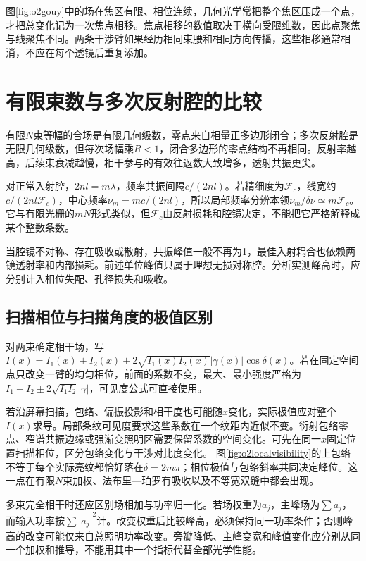 图\ref{fig:o2gouy}中的场在焦区有限、相位连续，几何光学常把整个焦区压成一个点，才把总变化记为一次焦点相移。焦点相移的数值取决于横向受限维数，因此点聚焦与线聚焦不同。两条干涉臂如果经历相同束腰和相同方向传播，这些相移通常相消，不应在每个透镜后重复添加。

\section{有限束数与多次反射腔的比较}
有限$N$束等幅的合场是有限几何级数，零点来自相量正多边形闭合；多次反射腔是无限几何级数，但每次场幅乘$R<1$，闭合多边形的零点结构不再相同。反射率越高，后续束衰减越慢，相干参与的有效往返数大致增多，透射共振更尖。

对正常入射腔，$2nl=m\lambda$，频率共振间隔$c/(2nl)$。若精细度为$\mathcal F_c$，线宽约$c/(2nl\mathcal F_c)$，中心频率$\nu_m=mc/(2nl)$，所以局部频率分辨本领$\nu_m/\delta\nu\simeq m\mathcal F_c$。它与有限光栅的$mN$形式类似，但$\mathcal F_c$由反射损耗和腔镜决定，不能把它严格解释成某个整数条数。

当腔镜不对称、存在吸收或散射，共振峰值一般不再为1，最佳入射耦合也依赖两镜透射率和内部损耗。前述单位峰值只属于理想无损对称腔。分析实测峰高时，应分别计入相位失配、孔径损失和吸收。

\subsection{扫描相位与扫描角度的极值区别}
对两束确定相干场，写$I(x)=I_1(x)+I_2(x)+2\sqrt{I_1(x)I_2(x)}|\gamma(x)|\cos\delta(x)$。若在固定空间点只改变一臂的均匀相位，前面的系数不变，最大、最小强度严格为$I_1+I_2\pm2\sqrt{I_1I_2}|\gamma|$，可见度公式可直接使用。

若沿屏幕扫描，包络、偏振投影和相干度也可能随$x$变化，实际极值应对整个$I(x)$求导。局部条纹可见度要求这些系数在一个纹距内近似不变。衍射包络零点、窄谱共振边缘或强渐变照明区需要保留系数的空间变化。可先在同一$x$固定位置扫描相位，区分包络变化与干涉对比度变化。
图\ref{fig:o2localvisibility}的上包络不等于每个实际亮纹都恰好落在$\delta=2m\pi$；相位极值与包络斜率共同决定峰位。这一点在有限$N$束加权、法布里—珀罗有吸收以及不等宽双缝中都会出现。

多束完全相干时还应区别场相加与功率归一化。若场权重为$a_j$，主峰场为$\sum a_j$，而输入功率按$\sum|a_j|^2$计。改变权重后比较峰高，必须保持同一功率条件；否则峰高的改变可能仅来自总照明功率改变。旁瓣降低、主峰变宽和峰值变化应分别从同一个加权和推导，不能用其中一个指标代替全部光学性能。

